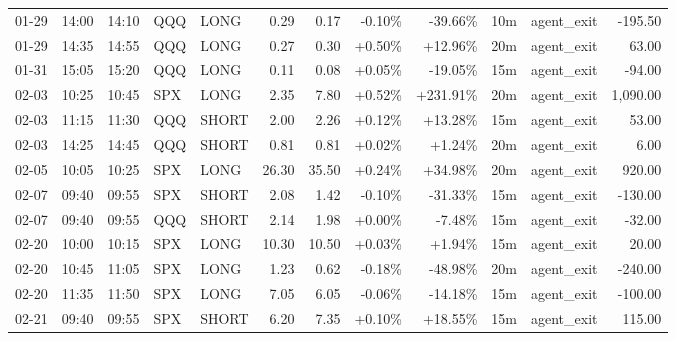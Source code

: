 \documentclass[11pt,a4paper]{article}
\begin{document}
\begin{center}
\begin{longtable}{>{\color{txtmain}}l l l l l r r r r r >{\color{txtmain}}l r}
01-29 & 14:00 & 14:10 & QQQ & LONG & 0.29 & 0.17 & \textcolor{lossred}{-0.10\%} & \textcolor{lossred}{-39.66\%} & 10m & agent\_exit & \textcolor{lossred}{-195.50} \\
01-29 & 14:35 & 14:55 & QQQ & LONG & 0.27 & 0.30 & \textcolor{wingreen}{+0.50\%} & \textcolor{wingreen}{+12.96\%} & 20m & agent\_exit & \textcolor{wingreen}{63.00} \\
01-31 & 15:05 & 15:20 & QQQ & LONG & 0.11 & 0.08 & \textcolor{wingreen}{+0.05\%} & \textcolor{lossred}{-19.05\%} & 15m & agent\_exit & \textcolor{lossred}{-94.00} \\
02-03 & 10:25 & 10:45 & SPX & LONG & 2.35 & 7.80 & \textcolor{wingreen}{+0.52\%} & \textcolor{wingreen}{+231.91\%} & 20m & agent\_exit & \textcolor{wingreen}{1,090.00} \\
02-03 & 11:15 & 11:30 & QQQ & SHORT & 2.00 & 2.26 & \textcolor{wingreen}{+0.12\%} & \textcolor{wingreen}{+13.28\%} & 15m & agent\_exit & \textcolor{wingreen}{53.00} \\
02-03 & 14:25 & 14:45 & QQQ & SHORT & 0.81 & 0.81 & \textcolor{wingreen}{+0.02\%} & \textcolor{wingreen}{+1.24\%} & 20m & agent\_exit & \textcolor{wingreen}{6.00} \\
02-05 & 10:05 & 10:25 & SPX & LONG & 26.30 & 35.50 & \textcolor{wingreen}{+0.24\%} & \textcolor{wingreen}{+34.98\%} & 20m & agent\_exit & \textcolor{wingreen}{920.00} \\
02-07 & 09:40 & 09:55 & SPX & SHORT & 2.08 & 1.42 & \textcolor{lossred}{-0.10\%} & \textcolor{lossred}{-31.33\%} & 15m & agent\_exit & \textcolor{lossred}{-130.00} \\
02-07 & 09:40 & 09:55 & QQQ & SHORT & 2.14 & 1.98 & \textcolor{wingreen}{+0.00\%} & \textcolor{lossred}{-7.48\%} & 15m & agent\_exit & \textcolor{lossred}{-32.00} \\
02-20 & 10:00 & 10:15 & SPX & LONG & 10.30 & 10.50 & \textcolor{wingreen}{+0.03\%} & \textcolor{wingreen}{+1.94\%} & 15m & agent\_exit & \textcolor{wingreen}{20.00} \\
02-20 & 10:45 & 11:05 & SPX & LONG & 1.23 & 0.62 & \textcolor{lossred}{-0.18\%} & \textcolor{lossred}{-48.98\%} & 20m & agent\_exit & \textcolor{lossred}{-240.00} \\
02-20 & 11:35 & 11:50 & SPX & LONG & 7.05 & 6.05 & \textcolor{lossred}{-0.06\%} & \textcolor{lossred}{-14.18\%} & 15m & agent\_exit & \textcolor{lossred}{-100.00} \\
02-21 & 09:40 & 09:55 & SPX & SHORT & 6.20 & 7.35 & \textcolor{wingreen}{+0.10\%} & \textcolor{wingreen}{+18.55\%} & 15m & agent\_exit & \textcolor{wingreen}{115.00} \\

\end{longtable}
\end{center}
\end{document}
